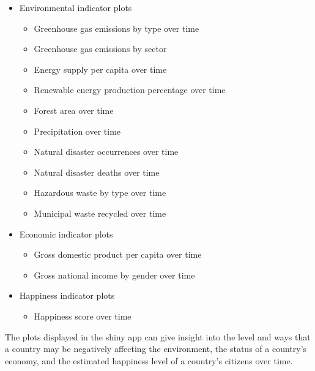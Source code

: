\documentclass[
]{article}
\providecommand{\tightlist}{%
  \setlength{\itemsep}{0pt}\setlength{\parskip}{0pt}}
\begin{document}
\begin{itemize}
\tightlist
\item
  Environmental indicator plots

  \begin{itemize}
  \tightlist
  \item
    Greenhouse gas emissions by type over time
  \item
    Greenhouse gas emissions by sector
  \item
    Energy supply per capita over time
  \item
    Renewable energy production percentage over time
  \item
    Forest area over time
  \item
    Precipitation over time
  \item
    Natural disaster occurrences over time
  \item
    Natural disaster deaths over time
  \item
    Hazardous waste by type over time
  \item
    Municipal waste recycled over time
  \end{itemize}
\item
  Economic indicator plots

  \begin{itemize}
  \tightlist
  \item
    Gross domestic product per capita over time
  \item
    Gross national income by gender over time
  \end{itemize}
\item
  Happiness indicator plots

  \begin{itemize}
  \tightlist
  \item
    Happiness score over time
  \end{itemize}
\end{itemize}

The plots displayed in the shiny app can give insight into the level and
ways that a country may be negatively affecting the environment, the
status of a country's economy, and the estimated happiness level of a
country's citizens over time.
\end{document}
